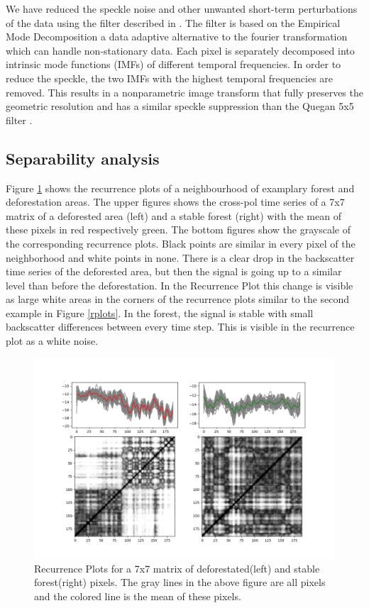 \documentclass{article}
\begin{document}
We have reduced the speckle noise and other unwanted short-term perturbations of the data using the filter described in \cite{Cremer2018}.
The filter is based on the Empirical Mode Decomposition a data adaptive alternative to the fourier transformation which can handle non-stationary data.
Each pixel is separately decomposed into intrinsic mode functions (IMFs) of different temporal frequencies.
In order to reduce the speckle, the two IMFs with the highest temporal frequencies are removed.
This results in a nonparametric image transform that fully preserves the geometric resolution and has a similar speckle suppression than the Quegan 5x5 filter \cite{Quegan_2001}.


\subsection{Separability analysis}

Figure \ref{rpforest} shows the recurrence plots of a neighbourhood of examplary forest and deforestation areas.
The upper figures shows the cross-pol time series of a 7x7 matrix of a deforested area (left) and a stable forest (right) with the mean of these pixels in red respectively green.
The bottom figures show the grayscale of the corresponding recurrence plots.
Black points are similar in every pixel of the neighborhood and white points in none.
There is a clear drop in the backscatter time series of the deforested area, but then the signal is going up to a similar level than before the deforestation.
In the Recurrence Plot this change is visible as large white areas in the corners of the recurrence plots similar to the second example in Figure \ref{rplots}.
In the forest, the signal is stable with small backscatter differences between every time step. This is visible in the recurrence plot as a white noise.

\begin{figure}
  \includegraphics[width=\textwidth]{figs/S1_Hidalgo_timestack_20km_VH___lin_20_test_tandemdem12_emd__rp_deffor_3.png}
  \caption{Recurrence Plots for a 7x7 matrix of deforestated(left) and stable forest(right) pixels.
           The gray lines in the above figure are all pixels and the colored line is the mean of these pixels.}
  \label{rpforest}
\end{figure}
\end{document}
